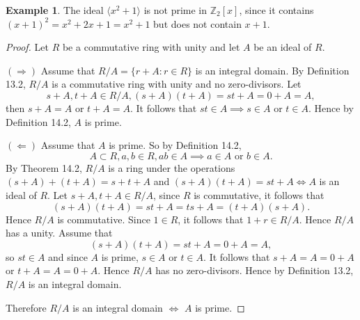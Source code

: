 \documentclass{article}
\newtheorem{theorem}{Theorem}[section]
\theoremstyle{definition}
\newtheorem{example}{Example}[section]
\begin{document}
\begin{example}
    The ideal $\langle x^2+1 \rangle$ is not prime in $\mathbb{Z}_2[x]$, since it contains $(x+1)^2=x^2+2x+1=x^2+1$ but does not contain $x+1$.
\end{example}

\noindent{}

\begin{proof}
     Let $R$ be a commutative ring with unity and let $A$ be an ideal of $R$.
     
     $(\Rightarrow)$ Assume that $R/A=\{r+A:r\in R\}$ is an integral domain. By Definition 13.2, $R/A$ is a commutative ring with unity and no zero-divisors. Let
     \begin{equation*}
         s+A,t+A\in R/A, (s+A)(t+A)=st+A=0+A=A,
     \end{equation*}
     then $s+A=A$ or $t+A=A$. It follows that $st\in A \implies s\in A$ or $t\in A$. Hence by Definition 14.2, $A$ is prime.
     
     $(\Leftarrow)$ Assume that $A$ is prime. So by Definition 14.2,
     \begin{equation*}
         A \subset R, a,b\in R, ab\in A \implies a\in A \text{ or } b\in A.
     \end{equation*}
     By Theorem 14.2, $R/A$ is a ring under the operations $(s+A)+(t+A)=s+t+A$ and $(s+A)(t+A)=st+A \iff A$ is an ideal of $R$. Let $s+A,t+A\in R/A$, since $R$ is commutative, it follows that
     \begin{equation*}
         (s+A)(t+A)=st+A=ts+A=(t+A)(s+A).
     \end{equation*}
     Hence $R/A$ is commutative. Since $1\in R$, it follows that $1+r\in R/A$. Hence $R/A$ has a unity. Assume that 
     \begin{equation*}
         (s+A)(t+A)=st+A=0+A=A,
     \end{equation*}
     so $st\in A$ and since $A$ is prime, $s\in A$ or $t\in A$. It follows that $s+A=A=0+A$ or $t+A=A=0+A$. Hence $R/A$ has no zero-divisors. Hence by Definition 13.2, $R/A$ is an integral domain.
     
     Therefore $R/A$ is an integral domain $\iff$ $A$ is prime.
\end{proof}
\end{document}
